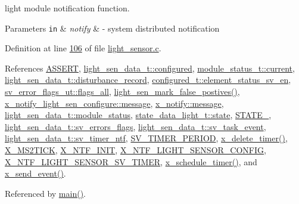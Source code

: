 light module notification function. 


\begin{DoxyParams}[1]{Parameters}
\mbox{\tt in}  & {\em notify} & -\/ system distributed notification \\
\hline
\end{DoxyParams}


Definition at line \hyperlink{a00047_source_l00106}{106} of file \hyperlink{a00047_source}{light\+\_\+sensor.\+c}.



References \hyperlink{a00072_source_l00059}{A\+S\+S\+E\+R\+T}, \hyperlink{a00024_source_l00041}{light\+\_\+sen\+\_\+data\+\_\+t\+::configured}, \hyperlink{a00017_source_l00156}{module\+\_\+status\+\_\+t\+::current}, \hyperlink{a00024_source_l00046}{light\+\_\+sen\+\_\+data\+\_\+t\+::disturbance\+\_\+record}, \hyperlink{a00021_source_l00205}{configured\+\_\+t\+::element\+\_\+status\+\_\+sv\+\_\+en}, \hyperlink{a00022_source_l00044}{sv\+\_\+error\+\_\+flags\+\_\+ut\+::flags\+\_\+all}, \hyperlink{a00047_source_l00491}{light\+\_\+sen\+\_\+mark\+\_\+false\+\_\+postives()}, \hyperlink{a00018_a32952acc732e2f16aad59fe0804da5bf}{x\+\_\+notify\+\_\+light\+\_\+sen\+\_\+configure\+::message}, \hyperlink{a00036_source_l00075}{x\+\_\+notify\+::message}, \hyperlink{a00024_source_l00050}{light\+\_\+sen\+\_\+data\+\_\+t\+::module\+\_\+status}, \hyperlink{a00017_source_l00150}{state\+\_\+data\+\_\+light\+\_\+t\+::state}, \hyperlink{a00021_source_l00149}{S\+T\+A\+T\+E\+\_}, \hyperlink{a00024_source_l00056}{light\+\_\+sen\+\_\+data\+\_\+t\+::sv\+\_\+errors\+\_\+flags}, \hyperlink{a00024_source_l00034}{light\+\_\+sen\+\_\+data\+\_\+t\+::sv\+\_\+task\+\_\+event}, \hyperlink{a00024_source_l00037}{light\+\_\+sen\+\_\+data\+\_\+t\+::sv\+\_\+timer\+\_\+ntf}, \hyperlink{a00023_source_l00020}{S\+V\+\_\+\+T\+I\+M\+E\+R\+\_\+\+P\+E\+R\+I\+O\+D}, \hyperlink{a00037_source_l00482}{x\+\_\+delete\+\_\+timer()}, \hyperlink{a00036_source_l00048}{X\+\_\+\+M\+S2\+T\+I\+C\+K}, \hyperlink{a00036_source_l00030}{X\+\_\+\+N\+T\+F\+\_\+\+I\+N\+I\+T}, \hyperlink{a00018_source_l00013}{X\+\_\+\+N\+T\+F\+\_\+\+L\+I\+G\+H\+T\+\_\+\+S\+E\+N\+S\+O\+R\+\_\+\+C\+O\+N\+F\+I\+G}, \hyperlink{a00024_source_l00015}{X\+\_\+\+N\+T\+F\+\_\+\+L\+I\+G\+H\+T\+\_\+\+S\+E\+N\+S\+O\+R\+\_\+\+S\+V\+\_\+\+T\+I\+M\+E\+R}, \hyperlink{a00037_source_l00456}{x\+\_\+schedule\+\_\+timer()}, and \hyperlink{a00037_source_l00381}{x\+\_\+send\+\_\+event()}.



Referenced by \hyperlink{a00048_source_l00080}{main()}.


